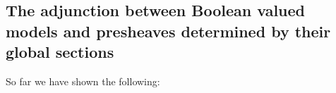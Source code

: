 \documentclass[11pt]{amsart}
\newcommand{\Mod}{\textrm{Mod}}
\newcommand{\LL}{\mathcal{L}}
\newcommand{\F}{\mathcal{F}}
\theoremstyle{plain}
\theoremstyle{definition}
\newtheorem{definition}[theorem]{Definition}
\theoremstyle{plain}
\theoremstyle{remark}
\newcommand{\M}{\mathcal{M}}
\newcommand{\dSet}{\mathsf{Set}}
\newcommand{\bool}[1]{\mathsf{#1}}
\newcommand{\0}{\mathsf{0}}
\renewcommand{\1}{\mathsf{1}}
\renewcommand{\2}{\mathsf{2}}
\theoremstyle{definition}
\begin{document}

\subsection{The adjunction between Boolean valued models and presheaves determined by their global sections}
 So far we have shown the following:
\end{document}
